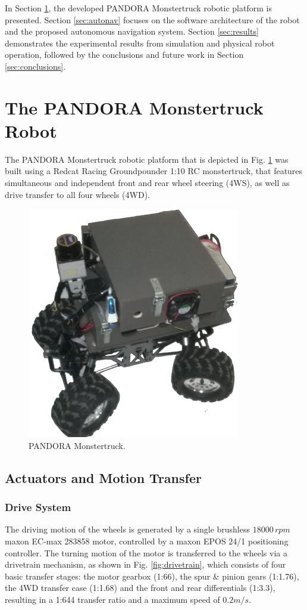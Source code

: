\documentclass[conference]{IEEEtran}
\begin{document}
In Section \ref{sec:robot}, the developed PANDORA Monstertruck robotic platform is presented.  Section \ref{sec:autonav} focuses on the software architecture of the robot and the proposed autonomous navigation system. Section \ref{sec:results} demonstrates the experimental results from simulation and physical robot operation, followed by the conclusions and future work in Section \ref{sec:conclusions}.

\section{The PANDORA Monstertruck Robot} \label{sec:robot}
The PANDORA Monstertruck robotic platform that is depicted in Fig. \ref{fig:monstertruck} was built using a Redcat Racing Groundpounder 1:10 RC monstertruck, that features simultaneous and independent front and rear wheel steering (4WS), as well as drive transfer to all four wheels (4WD).

\begin{figure}[!ht]
	\centering
	\includegraphics[width=0.45\linewidth]{Figures/monstertruck.png}
	\caption{PANDORA Monstertruck.}
	\label{fig:monstertruck}
\end{figure}

\subsection{Actuators and Motion Transfer}
\subsubsection{Drive System}
The driving motion of the wheels is generated by a single brushless $18000\, rpm$ maxon EC-max 283858 motor, controlled by a maxon EPOS 24/1 positioning controller. The turning motion of the motor is transferred to the wheels via a drivetrain mechanism, as shown in Fig. \ref{fig:drivetrain}, which consists of four basic transfer stages: the motor gearbox (1:66), the spur \& pinion gears (1:1.76), the 4WD transfer case (1:1.68) and the front and rear differentials (1:3.3), resulting in a 1:644 transfer ratio and a maximum speed of $0.2m/s$.
\end{document}
